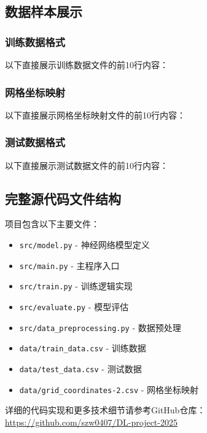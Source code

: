 \documentclass{article}
\begin{document}
\subsection{数据样本展示}
\subsubsection{训练数据格式}
以下直接展示训练数据文件的前10行内容：

\subsubsection{网格坐标映射}
以下直接展示网格坐标映射文件的前10行内容：

\subsubsection{测试数据格式}
以下直接展示测试数据文件的前10行内容：

\subsection{完整源代码文件结构}

项目包含以下主要文件：

\begin{itemize}
    \item \texttt{src/model.py} - 神经网络模型定义
    \item \texttt{src/main.py} - 主程序入口
    \item \texttt{src/train.py} - 训练逻辑实现
    \item \texttt{src/evaluate.py} - 模型评估
    \item \texttt{src/data\_preprocessing.py} - 数据预处理
    \item \texttt{data/train\_data.csv} - 训练数据
    \item \texttt{data/test\_data.csv} - 测试数据
    \item \texttt{data/grid\_coordinates-2.csv} - 网格坐标映射
\end{itemize}

详细的代码实现和更多技术细节请参考GitHub仓库：\url{https://github.com/szw0407/DL-project-2025}
\end{document}

